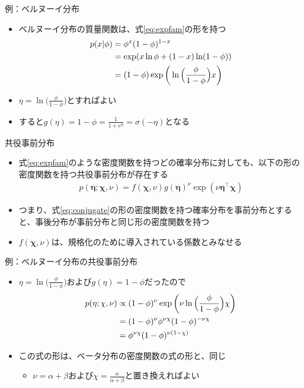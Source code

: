 \documentclass[aspectratio=169,unicode,dvipdfmx,14pt]{beamer}
\begin{document}
\begin{frame}{例：ベルヌーイ分布}
\begin{itemize}
\item ベルヌーイ分布の質量関数は、式\eqref{eq:expfam}の形を持つ
\begin{align}
p(x|\phi) & = \phi^x (1 - \phi)^{1 - x}
\notag \\ & = \exp( x\ln\phi + (1-x)\ln(1-\phi) )
\notag \\ & = (1 - \phi) \exp\bigg( \ln \Big( \frac{\phi}{1 - \phi} \Big) x \bigg)
\end{align}
\item $\eta = \ln \Big( \frac{\phi}{1 - \phi} \Big)$とすればよい
\item すると$g(\eta) = 1 - \phi = \frac{1}{1 + e^\eta} = \sigma(- \eta)$となる
\end{itemize}
\end{frame}


\begin{frame}{共役事前分布}
\begin{itemize}
\item 式\eqref{eq:expfam}のような密度関数を持つどの確率分布に対しても、以下の形の密度関数を持つ共役事前分布が存在する
\begin{align}
p(\bm{\eta};\bm{\chi},\nu) = f(\bm{\chi}, \nu) g(\bm{\eta})^\nu \exp(\nu\bm{\eta}^\intercal\bm{\chi})
\label{eq:conjugate}
\end{align}
\item つまり、式\eqref{eq:conjugate}の形の密度関数を持つ確率分布を事前分布とすると、事後分布が事前分布と同じ形の密度関数を持つ
\item $f(\bm{\chi}, \nu)$は、規格化のために導入されている係数とみなせる
\end{itemize}
\end{frame}

\begin{frame}{例：ベルヌーイ分布の共役事前分布}
\begin{itemize}
\item $\eta = \ln \Big( \frac{\phi}{1 - \phi} \Big)$および$g(\eta) = 1 - \phi$だったので
\begin{align}
p(\eta; \chi,\nu) & \propto (1 - \phi)^\nu \exp \bigg(\nu \ln \Big( \frac{\phi}{1 - \phi} \Big) \chi \bigg)
\notag \\ & = (1 - \phi)^\nu \phi^{\nu\chi} (1 - \phi)^{ - \nu\chi}
\notag \\ & = \phi^{\nu\chi} (1 - \phi)^{\nu(1 - \chi)}
\end{align}
\item この式の形は、ベータ分布の密度関数の式の形と、同じ
\begin{itemize}
\item $\nu = \alpha + \beta$および$\chi = \frac{\alpha}{\alpha + \beta}$と置き換えればよい
\end{itemize}
\end{itemize}
\end{frame}
\end{document}
